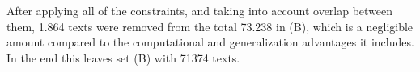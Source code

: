 After applying all of the constraints, and taking into account
overlap between them, 1.864 texts were removed from the total 73.238 in (B),
which is a negligible amount compared to the computational and generalization
advantages it includes.
In the end this leaves set (B) with 71374 texts.

\begin{figure}[htb]
\begin{minipage}{.5\linewidth}
\centering
{}
\end{minipage}%
\begin{minipage}{.5\linewidth}
\centering
{}

\end{minipage}
\end{figure}
